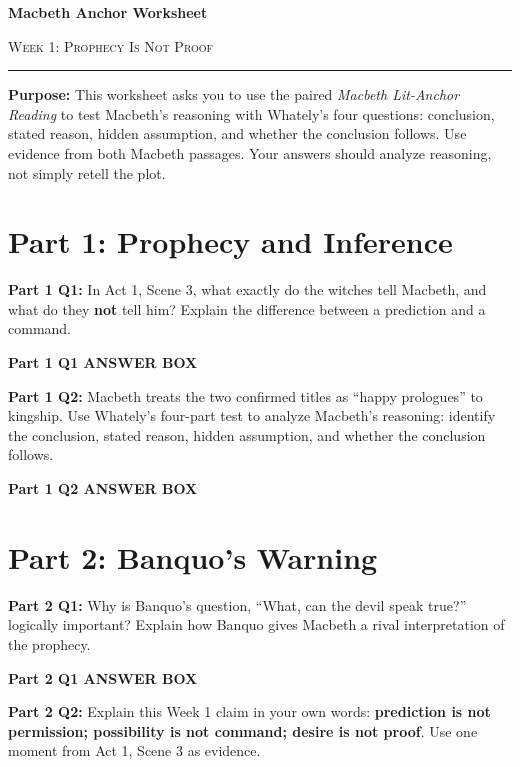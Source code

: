 \documentclass[12pt]{article}
\newcommand{\answerbox}[2]{%
\vspace{0.15em}
\noindent\textbf{#1}\par
\vspace{0.05em}
\noindent\fbox{%
\begin{minipage}[t][#2]{\dimexpr\textwidth-2\fboxsep-2\fboxrule}
\rule{\textwidth}{0pt}
\vspace{#2}
\end{minipage}
}\par
\vspace{0.25em}
}
\begin{document}
\begin{center}
{\LARGE\bfseries Macbeth Anchor Worksheet}\par\vspace{0.05em}
{\large\scshape Week 1: Prophecy Is Not Proof}\par\vspace{0.1em}
\rule{0.78\textwidth}{0.5pt}\par\vspace{0.15em}
\end{center}

\noindent\textbf{Purpose:} This worksheet asks you to use the paired \textit{Macbeth Lit-Anchor Reading} to test Macbeth's reasoning with Whately's four questions: conclusion, stated reason, hidden assumption, and whether the conclusion follows. Use evidence from both Macbeth passages. Your answers should analyze reasoning, not simply retell the plot.

\vspace{0.3em}

\section*{Part 1: Prophecy and Inference}

\textbf{Part 1 Q1:} In Act 1, Scene 3, what exactly do the witches tell Macbeth, and what do they \textbf{not} tell him? Explain the difference between a prediction and a command.

\answerbox{Part 1 Q1 ANSWER BOX}{1.75in}

\textbf{Part 1 Q2:} Macbeth treats the two confirmed titles as ``happy prologues'' to kingship. Use Whately's four-part test to analyze Macbeth's reasoning: identify the conclusion, stated reason, hidden assumption, and whether the conclusion follows.

\answerbox{Part 1 Q2 ANSWER BOX}{1.85in}

\newpage

\section*{Part 2: Banquo's Warning}

\textbf{Part 2 Q1:} Why is Banquo's question, ``What, can the devil speak true?'' logically important? Explain how Banquo gives Macbeth a rival interpretation of the prophecy.

\answerbox{Part 2 Q1 ANSWER BOX}{2.2in}

\textbf{Part 2 Q2:} Explain this Week 1 claim in your own words: \textbf{prediction is not permission; possibility is not command; desire is not proof}. Use one moment from Act 1, Scene 3 as evidence.
\end{document}
